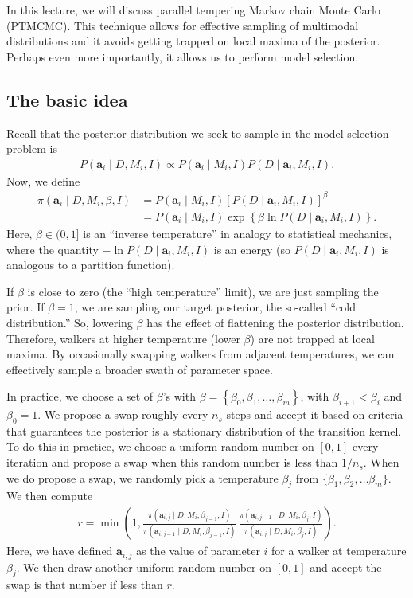 In this lecture, we will discuss parallel tempering Markov chain Monte
Carlo (PTMCMC).  This technique allows for effective sampling of
multimodal distributions and it avoids getting trapped on local maxima
of the posterior. Perhaps even more importantly, it allows us to perform model selection.

\subsection{The basic idea}
Recall that the posterior distribution we seek to sample in the model
selection problem is
\begin{align}
P(\mathbf{a}_i\mid D, M_i, I) \propto P(\mathbf{a}_i \mid M_i, I)
P(D\mid \mathbf{a}_i,M_i, I).
\end{align}
Now, we define
\begin{align}
\pi(\mathbf{a}_i\mid D, M_i, \beta, I) &= P(\mathbf{a}_i \mid M_i, I)
\left[P(D\mid \mathbf{a}_i,M_i, I)\right]^\beta \\
&= P(\mathbf{a}_i \mid M_i, I) \exp\left\{\beta \ln P(D\mid \mathbf{a}_i,M_i, I)\right\}.
\end{align}
Here, $\beta \in (0, 1]$ is an ``inverse temperature'' in analogy to
statistical mechanics, where the quantity $-\ln P(D\mid \mathbf{a}_i,M_i, I)$ is an
energy (so $P(D\mid \mathbf{a}_i,M_i, I)$ is analogous to a partition
function).

If $\beta$ is close to zero (the ``high temperature'' limit), we are
just sampling the prior.  If $\beta = 1$, we are sampling our target
posterior, the so-called ``cold distribution.''  So, lowering $\beta$
has the effect of flattening the posterior distribution.  Therefore,
walkers at higher temperature (lower $\beta$) are not trapped at local
maxima.  By occasionally swapping walkers from adjacent temperatures,
we can effectively sample a broader swath of parameter space.

In practice, we choose a set of $\beta$'s with
$\beta = \left\{\beta_0, \beta_1, \ldots, \beta_m\right\}$, with
$\beta_{i+1} < \beta_i$ and $\beta_0 = 1$. We propose a swap roughly every $n_s$ steps and accept it based on criteria that guarantees the posterior is a stationary distribution of the transition kernel.  To do this in practice, we choose a
uniform random number on $[0,1]$ every iteration and propose a swap
when this random number is less than $1/n_s$.  When we do propose a
swap, we randomly pick a temperature $\beta_j$ from
$\{\beta_1, \beta_2, \ldots \beta_m\}$.  We then compute
\begin{align}
r = \min \left(1,
\frac{\pi(\mathbf{a}_{i,j}\mid D, M_i, \beta_{j-1}, I)}{\pi(\mathbf{a}_{i,j-1}\mid D, M_i, \beta_{j-1}, I)}\,
\frac{\pi(\mathbf{a}_{i,j-1}\mid D, M_i, \beta_j, I)}{\pi(\mathbf{a}_{i,j}\mid D, M_i, \beta_j, I)}\right).
\end{align}
Here, we have defined $\mathbf{a}_{i,j}$ as the value of parameter $i$ for a walker at temperature $\beta_j$.
We then draw another uniform random number on $[0,1]$ and accept the swap
is that number if less than $r$.

